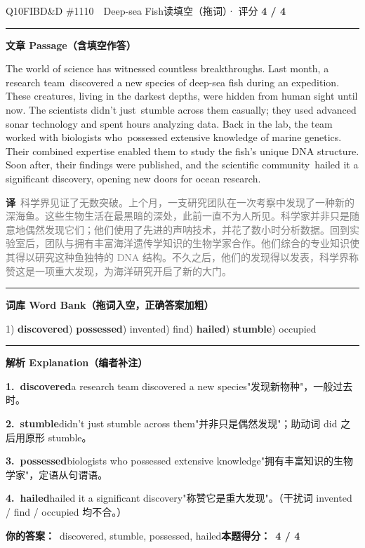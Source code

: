 \documentclass[11pt]{article}
\newcommand{\ptesub}[1]{%
  \par\needspace{2\baselineskip}\smallskip
  {\color{cAccent}\rule[-0.2ex]{3pt}{1.05em}}\hspace{6pt}%
  {\bfseries\color{cHead}#1}\par\nopagebreak\smallskip}
\newcommand{\zh}[1]{{\footnotesize\textcolor{cNote}{\textbf{译}}\ \textcolor{gray}{#1}}}
\newcommand{\rok}[1]{{\color{cFix}\ding{51}\,#1}}                 %
\begin{document}
\begin{qblock}{Q10\quad FIBD\&D \#1110\ \ Deep-sea Fish}{读填空（拖词）· 评分 \textcolor{cAccent}{\bfseries 4 / 4}}
\ptesub{文章 Passage（含填空作答）}
\begin{promptbox}
The world of science has witnessed countless breakthroughs. Last month, a research team \rok{discovered} a new species of deep-sea fish during an expedition. These creatures, living in the darkest depths, were hidden from human sight until now. The scientists didn't just \rok{stumble} across them casually; they used advanced sonar technology and spent hours analyzing data. Back in the lab, the team worked with biologists who \rok{possessed} extensive knowledge of marine genetics. Their combined expertise enabled them to study the fish's unique DNA structure. Soon after, their findings were published, and the scientific community \rok{hailed} it a significant discovery, opening new doors for ocean research.
\end{promptbox}
\zh{科学界见证了无数突破。上个月，一支研究团队在一次考察中发现了一种新的深海鱼。这些生物生活在最黑暗的深处，此前一直不为人所见。科学家并非只是随意地偶然发现它们；他们使用了先进的声呐技术，并花了数小时分析数据。回到实验室后，团队与拥有丰富海洋遗传学知识的生物学家合作。他们综合的专业知识使其得以研究这种鱼独特的 DNA 结构。不久之后，他们的发现得以发表，科学界称赞这是一项重大发现，为海洋研究开启了新的大门。}
\ptesub{词库 Word Bank（拖词入空，正确答案加粗）}
{\small 1) \textbf{discovered}) \textbf{possessed}) invented) find) \textbf{hailed}) \textbf{stumble}) occupied}
\ptesub{解析 Explanation（编者补注）}
\begin{notebox}\footnotesize
\textbf{1.\ discovered}\quad a research team discovered a new species"发现新物种"，一般过去时。\par\smallskip
\textbf{2.\ stumble}\quad didn't just stumble across them"并非只是偶然发现"；助动词 did 之后用原形 stumble。\par\smallskip
\textbf{3.\ possessed}\quad biologists who possessed extensive knowledge"拥有丰富知识的生物学家"，定语从句谓语。\par\smallskip
\textbf{4.\ hailed}\quad hailed it a significant discovery"称赞它是重大发现"。（干扰词 invented / find / occupied 均不合。）
\end{notebox}
\smallskip
\textbf{你的答案：}\ discovered, stumble, possessed, hailed\qquad\textbf{本题得分：}\ {\color{cAccent}\bfseries 4 / 4}
\end{qblock}
\end{document}
